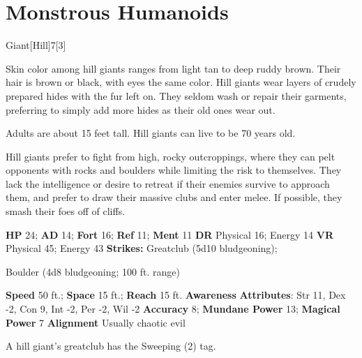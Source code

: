   
        \section{Monstrous Humanoids}
      
  \begin{monsection}{Giant}[Hill]{7}[3]
    \vspace{-1em}\vspace{-1em}
    \vspace{0em}

    
      Skin color among hill giants ranges from light tan to deep ruddy brown. Their hair is brown or black, with eyes the same color. Hill giants wear layers of crudely prepared hides with the fur left on. They seldom wash or repair their garments, preferring to simply add more hides as their old ones wear out.

      Adults are about 15 feet tall. Hill giants can live to be 70 years old.
    
      Hill giants prefer to fight from high, rocky outcroppings, where they can pelt opponents with rocks and boulders while limiting the risk to themselves.
      They lack the intelligence or desire to retreat if their enemies survive to approach them, and prefer to draw their massive clubs and enter melee.
      If possible, they smash their foes off of cliffs.
    

    \begin{spellcontent}
      \begin{spelltargetinginfo}
        \pari \textbf{HP} 24;
          \textbf{AD} 14;
          \textbf{Fort} 16;
          \textbf{Ref} 11;
          \textbf{Ment} 11
        \pari \textbf{DR} Physical 16; Energy 14
        \pari \textbf{VR} Physical 45; Energy 43
        \pari \textbf{Strikes:}
            Greatclub  (5d10 bludgeoning);
\par Boulder  (4d8 bludgeoning; 100 ft. range)
      \end{spelltargetinginfo}
    \end{spellcontent}
    \begin{monsterfooter}
      \pari \textbf{Speed} 50 ft.;
        \textbf{Space} 15 ft.;
        \textbf{Reach} 15 ft.
      \pari \textbf{Awareness} 
      \pari \textbf{Attributes}:
        Str 11, Dex -2,
        Con 9, Int -2,
        Per -2, Wil -2
      \pari \textbf{Accuracy} 8;
        \textbf{Mundane Power} 13;
      \textbf{Magical Power} 7
      \pari \textbf{Alignment} Usually chaotic evil
    \end{monsterfooter}
  \end{monsection}
   A hill giant's greatclub has the Sweeping (2) tag.
  
